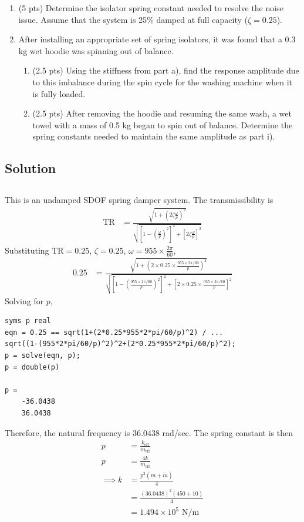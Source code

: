 \begin{enumerate}[label=(\alph*)]
    \item (5 pts) Determine the isolator spring constant needed to resolve the noise issue. Assume that the system is 25\% damped at full capacity ($\zeta = 0.25$).
    \item After installing an appropriate set of spring isolators, it was found that a 0.3 kg wet hoodie was spinning out of balance.
    \begin{enumerate}[label=(\roman*)]
        \item (2.5 pts) Using the stiffness from part a), find the response amplitude due to this imbalance during the spin cycle for the washing machine when it is fully loaded.
        \item (2.5 pts) After removing the hoodie and resuming the same wash, a wet towel with a mass of 0.5 kg began to spin out of balance. Determine the spring constants needed to maintain the same amplitude as part i).
    \end{enumerate}
\end{enumerate}

\subsection*{Solution}
\subsection{}
This is an undamped SDOF spring damper system. The transmissibility is 
\begin{align*}
    \text{TR} &= \frac{\sqrt{1 + \left(2 \zeta \frac{\omega}{p}\right)^2}}{\sqrt{\left[1 - \left(\frac{\omega}{p}\right)^2\right]^2 + \left[2 \zeta \frac{\omega}{p}\right]^2}}
\end{align*}
Substituting $\text{TR} = 0.25$, $\zeta = 0.25$, $\omega = 955 \times \frac{2\pi}{60}$,
\begin{align*}
    0.25 &= \frac{\sqrt{1 + \left(2 \times 0.25 \times \frac{955 \times 2\pi/60}{p}\right)^2}}{\sqrt{\left[1 - \left(\frac{955 \times 2\pi/60}{p}\right)^2\right]^2 + \left[2 \times 0.25 \times \frac{955 \times 2\pi/60}{p}\right]^2}}
\end{align*}
Solving for $p$,
\begin{verbatim}
syms p real
eqn = 0.25 == sqrt(1+(2*0.25*955*2*pi/60/p)^2) / ...
sqrt((1-(955*2*pi/60/p)^2)^2+(2*0.25*955*2*pi/60/p)^2);
p = solve(eqn, p);
p = double(p)

p =
    -36.0438
    36.0438
\end{verbatim}
Therefore, the natural frequency is $36.0438$ rad/sec. The spring constant is then
\begin{align*}
    p &= \frac{k_{\text{eff}}}{m_{\text{eff}}} \\
    p &= \frac{4k}{m_{\text{eff}}} \\
    \implies k &= \frac{p^2 (m + \tilde{m})}{4} \\
    &= \frac{(36.0438)^2(450 + 10)}{4} \\
    &= \boxed{1.494 \times 10^5 \text{ N/m}}
\end{align*}

